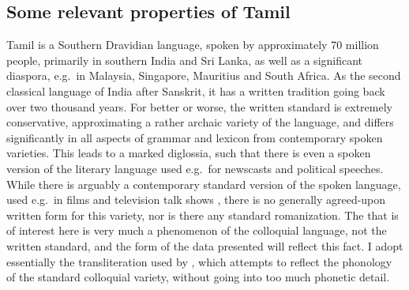 \documentclass[output=paper, modfonts, nonflat]{langsci/langscibook}
\begin{document}
\subsection{Some relevant properties of Tamil}


Tamil is a Southern Dravidian language, spoken by approximately 70
million people, primarily in southern India and Sri Lanka, as well as
a significant diaspora, e.g.\ in Malaysia, Singapore, Mauritius and
South Africa. As the second classical language of India after
Sanskrit, it has a written tradition going back over two thousand
years. For better or worse, the written standard is extremely
conservative, approximating a rather archaic variety of the language,
and differs significantly in all aspects of grammar and lexicon from
contemporary spoken varieties. This leads to a marked diglossia, such
that there is even a spoken version of the literary language used
e.g.\ for newscasts and political speeches. While there is arguably a
contemporary standard version of the spoken language, used e.g.\ in
films and television talk shows \citep[see e.g.][]{schiffman:1999,
  asherannamalai:2002}, there is no generally agreed-upon written form
for this variety, nor is there any standard romanization. The
\allagr{} that is of interest here is very much a phenomenon of the
colloquial language, not the written standard, and the form of the
data presented will reflect this fact. I adopt essentially the
transliteration used by \citet{sundaresan:diss}, which attempts to
reflect the phonology of the standard colloquial variety, without
going into too much phonetic detail.
\end{document}
